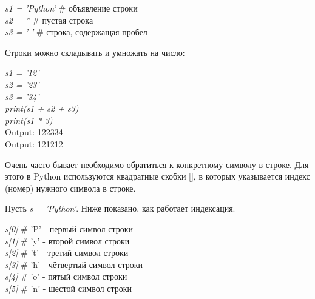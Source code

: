 \begin{flushleft}
	\colorbox[rgb]{0.95, 0.95, 0.95}{\textit{s1 = 'Python'}  \# объявление строки} \\
	\colorbox[rgb]{0.95, 0.95, 0.95}{\textit{s2 = ''} \hspace{1.35cm} \# пустая строка} \\
	\colorbox[rgb]{0.95, 0.95, 0.95}{\textit{s3 = ' '} \hspace{0.9cm} \# строка, содержащая пробел}
\end{flushleft}

Строки можно складывать и умножать на число:

\begin{flushleft}
	\colorbox[rgb]{0.95, 0.95, 0.95}{\textit{s1 = '12'}} \\
	\colorbox[rgb]{0.95, 0.95, 0.95}{\textit{s2 = '23'}} \\
	\colorbox[rgb]{0.95, 0.95, 0.95}{\textit{s3 = '34'}} \\
	\colorbox[rgb]{0.95, 0.95, 0.95}{\textit{print(s1 + s2 + s3)}} \\
	\colorbox[rgb]{0.95, 0.95, 0.95}{\textit{print(s1 * 3)}} \\
	\vspace{1cm}
	\colorbox[rgb]{0.95, 0.95, 0.95}{Output: 122334} \\
	\colorbox[rgb]{0.95, 0.95, 0.95}{Output: 121212} \\
\end{flushleft}

Очень часто бывает необходимо обратиться к конкретному символу в строке. Для этого в Python используются квадратные скобки [], в которых указывается индекс (номер) нужного символа в строке.

Пусть \colorbox[rgb]{0.95, 0.95, 0.95}{\textit{s = 'Python'}}. Ниже показано, как работает индексация.

\begin{flushleft}
	\colorbox[rgb]{0.95, 0.95, 0.95}{\textit{s[0]} \hspace{1cm} \# 'P' - первый символ строки} \\
	\colorbox[rgb]{0.95, 0.95, 0.95}{\textit{s[1]} \hspace{1cm} \# 'y' - второй символ строки} \\
	\colorbox[rgb]{0.95, 0.95, 0.95}{\textit{s[2]} \hspace{1cm} \# 't' - третий символ строки} \\
	\colorbox[rgb]{0.95, 0.95, 0.95}{\textit{s[3]} \hspace{1cm} \# 'h' - чётвертый символ строки} \\
	\colorbox[rgb]{0.95, 0.95, 0.95}{\textit{s[4]} \hspace{1cm} \# 'o' - пятый символ строки} \\
	\colorbox[rgb]{0.95, 0.95, 0.95}{\textit{s[5]} \hspace{1cm} \# 'n' - шестой символ строки} \\
\end{flushleft}

